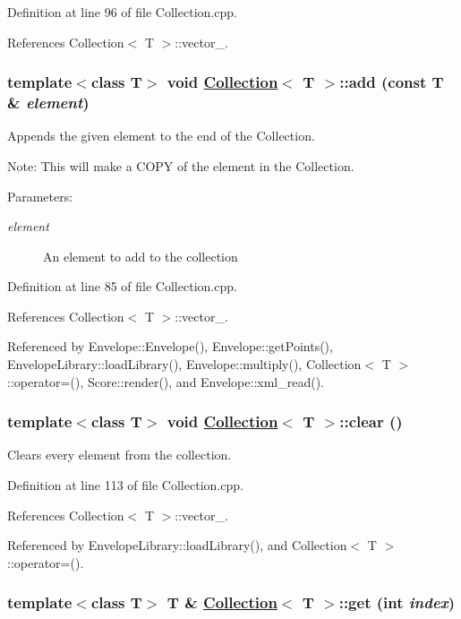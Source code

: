 Definition at line 96 of file Collection.cpp.

References Collection$<$ T $>$::vector\_\-.\hypertarget{classCollection_a4}{
\subsubsection[add]{\setlength{\rightskip}{0pt plus 5cm}template$<$class T$>$ void \hyperlink{classCollection}{Collection}$<$ T $>$::add (const T \& {\em element})}}
\label{classCollection_a4}


Appends the given element to the end of the Collection. \begin{Desc}
\item[Note:]This will make a COPY of the element in the Collection. \end{Desc}
\begin{Desc}
\item[Parameters:]
\begin{description}
\item[{\em element}]An element to add to the collection \end{description}
\end{Desc}


Definition at line 85 of file Collection.cpp.

References Collection$<$ T $>$::vector\_\-.

Referenced by Envelope::Envelope(), Envelope::get\-Points(), Envelope\-Library::load\-Library(), Envelope::multiply(), Collection$<$ T $>$::operator=(), Score::render(), and Envelope::xml\_\-read().\hypertarget{classCollection_a6}{
\subsubsection[clear]{\setlength{\rightskip}{0pt plus 5cm}template$<$class T$>$ void \hyperlink{classCollection}{Collection}$<$ T $>$::clear ()}}
\label{classCollection_a6}


Clears every element from the collection. 

Definition at line 113 of file Collection.cpp.

References Collection$<$ T $>$::vector\_\-.

Referenced by Envelope\-Library::load\-Library(), and Collection$<$ T $>$::operator=().\hypertarget{classCollection_a7}{
\subsubsection[get]{\setlength{\rightskip}{0pt plus 5cm}template$<$class T$>$ T \& \hyperlink{classCollection}{Collection}$<$ T $>$::get (int {\em index})}}
\label{classCollection_a7}


